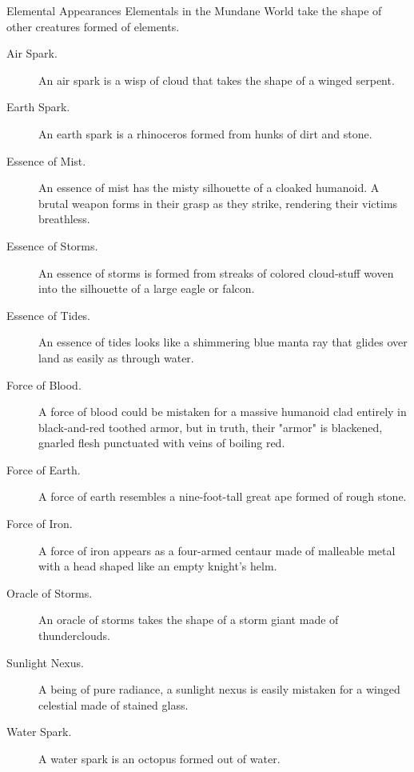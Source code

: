 \documentclass[10pt,a4paper,twoside,bg=print,twocolumn,openany,nodeprecatedcode]{dndbook}
\begin{document}
\begin{DndSidebar}[float=!b]{Elemental Appearances}
Elementals in the Mundane World take the shape of other creatures formed of elements.




\begin{description}
\item[Air Spark.]
An air spark is a wisp of cloud that takes the shape of a winged serpent.

\item[Earth Spark.]
An earth spark is a rhinoceros formed from hunks of dirt and stone.

\item[Essence of Mist.]
An essence of mist has the misty silhouette of a cloaked humanoid. A brutal weapon forms in their grasp as they strike, rendering their victims breathless.

\item[Essence of Storms.]
An essence of storms is formed from streaks of colored cloud-stuff woven into the silhouette of a large eagle or falcon.

\item[Essence of Tides.]
An essence of tides looks like a shimmering blue manta ray that glides over land as easily as through water.

\item[Force of Blood.]
A force of blood could be mistaken for a massive humanoid clad entirely in black-and-red toothed armor, but in truth, their "armor" is blackened, gnarled flesh punctuated with veins of boiling red.

\item[Force of Earth.]
A force of earth resembles a nine-foot-tall great ape formed of rough stone.

\item[Force of Iron.]
A force of iron appears as a four-armed centaur made of malleable metal with a head shaped like an empty knight's helm.

\item[Oracle of Storms.]
An oracle of storms takes the shape of a storm giant made of thunderclouds.

\item[Sunlight Nexus.]
A being of pure radiance, a sunlight nexus is easily mistaken for a winged celestial made of stained glass.

\item[Water Spark.]
A water spark is an octopus formed out of water.

\end{description}



\end{DndSidebar}
\end{document}
